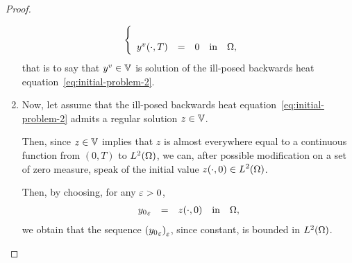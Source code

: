 \begin{proof}
\begin{enumerate}
\begin{equation*}
\begin{cases}
\begin{array}{rclll}
                        \\
                        {y^{v}}\!\left({\cdot,T}\right) & = & 0 & \text{in} & \Omega,
                    \end{array}
                \end{cases}
            \end{equation*}
            that is to say that $y^{v}\in \mathbb{V}$ is solution of the
            ill-posed backwards heat equation~\eqref{eq:initial-problem-2}.
        \item Now, let assume that the ill-posed backwards heat
            equation~\eqref{eq:initial-problem-2} admits a regular solution
            $z\in \mathbb{V}$.

            Then, since $z\in \mathbb{V}$ implies that $z$ is almost everywhere
            equal to a continuous function from $(0,T)$ to
            $L^{2}\!\left({\Omega}\right)$, we can, after possible modification on a set
            of zero measure, speak of the initial value $\displaystyle
            {z}\!\left({\cdot, 0}\right)\in L^{2}\!\left({\Omega}\right)$.

            Then, by choosing, for any $\varepsilon > 0$,
            \begin{equation*}
                \begin{array}{rclll}
                    {y_{0}}_{\varepsilon} & = & {z}\!\left({\cdot, 0}\right) & \text{in} &
                    \Omega,
                \end{array}
            \end{equation*}
            we obtain that the sequence
            ${\left({{y_{0}}_{\varepsilon}}\right)}_{\varepsilon}$, since constant, is
            bounded in $L^{2}\!\left({\Omega}\right)$.
    \end{enumerate}
\end{proof}
